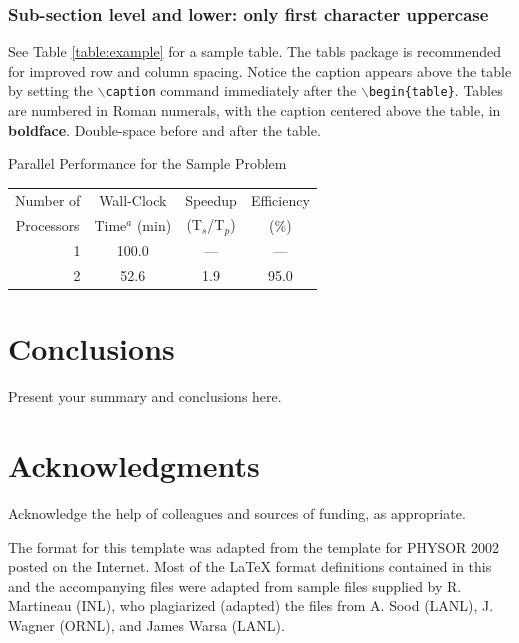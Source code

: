 \documentclass{ansconf}
\begin{document}
\begin{multicols}{2}
\subsubsection{Sub-section level and lower: only first character uppercase}

See Table \ref{table:example} for a sample table.  The tabls package is
recommended for improved row and column spacing.  Notice the caption appears 
above the table by setting the \texttt{$\backslash$caption} command immediately 
after the \texttt{$\backslash$begin\{table\}}. Tables are numbered in Roman 
numerals, with the caption centered above the table, in {\bf boldface}.  
Double-space before and after the table.

%
\vspace{8pt}
\begin{tablehere}
\centering
\caption{Parallel Performance for the Sample Problem}
\label{table:example}
\begin{tabular}{rccc}
 \toprule
 \multicolumn{1}{c}{Number of} & 
 Wall-Clock & 
 Speedup    & 
 Efficiency \\
 \multicolumn{1}{c}{Processors} & 
 Time$^{a}$ (min)  & 
 (T$_{s}$/T$_{p}$) & 
 (\%)              \\
 \midrule
 \midrule
 1 &  100.0 &  ---    & ---  \\
 \midrule
 2 &   52.6 &  1.9    & 95.0 \\
 \bottomrule 
\end{tabular}
\end{tablehere}
\vspace{8pt}
%

\section{Conclusions}

Present your summary and conclusions here.


\section*{Acknowledgments}

Acknowledge the help of colleagues and sources of funding, as appropriate.

The format for this template was adapted from the template for PHYSOR 2002 
posted on the Internet.  Most of the {\LaTeX} format definitions contained
in this and the accompanying files were adapted from sample files supplied 
by R. Martineau (INL), who plagiarized (adapted) the files from A. Sood 
(LANL), J. Wagner (ORNL), and James Warsa (LANL).


\setlength{\baselineskip}{12pt}




\end{multicols}
\end{document}
